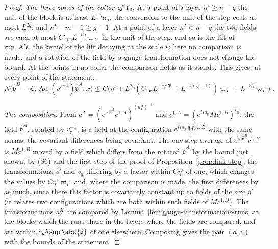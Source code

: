 \begin{proof}
\emph{The three zones of the collar of $Y_2$.} At a point of a layer $n' \geq n - q$ the unit of the block is at least $L^{-q}a_n$, the conversion to the unit of the step costs at most $L^{2q}$, and $n' - m - 1 \geq g - 1$. At a point of a layer $n' < n - q$ the two fields are each at most $C'_{\mathrm{dis}}L^{-5q}\varpi_\Gamma$ in the unit of the step, and so is the lift of run~A's, the kernel of the lift decaying at the scale $\varepsilon$; here no comparison is made, and a rotation of the field by a gauge transformation does not change the bound. At the points in no collar the comparison holds as it stands. This gives, at every point of the statement,
\[
    N\bigl(\hat{\mathfrak v}^B - \mathcal L_\iota\operatorname{Ad}(v'^{-1})\hat{\mathfrak v}^A; x\bigr) \leq C\bigl(\eta' + L^{2q}(C_{\mathrm{loc}}L^{-\nu/26} + L^{-4(g-1)})\varpi_\Gamma + L^{-5q}\varpi_\Gamma\bigr)\;.
\]

\emph{The composition.} From $c^A = (e^{i\varepsilon\hat{\mathfrak v}^A}c^{1,A})^{(u^A_\Gamma)^{-1}}$ and $c^{1,A} = (e^{i\varepsilon a_{\mathrm g}}Mc^{1,B})^{v_{\mathrm g}}$, the field $\hat{\mathfrak v}^A$, rotated by $v_{\mathrm g}^{-1}$, is a field at the configuration $e^{i\varepsilon a_{\mathrm g}}Mc^{1,B}$ with the same norms, the covariant differences being covariant. The one-step average of $e^{ih\hat{\mathfrak v}^B}c^{1,B}$ is $Mc^{1,B}$ moved by a field which differs from the rotated $\hat{\mathfrak v}^A$ by the bound just shown, by (S6) and the first step of the proof of Proposition~\ref{prop:link-step}, the transformations $v'$ and $v_{\mathrm g}$ differing by a factor within $C\eta'$ of one, which changes the values by $C\eta'\varpi_\Gamma$ and, where the comparison is made, the first differences by as much, since there this factor is covariantly constant up to fields of the size $\eta'$ (it relates two configurations which are both within such fields of $Mc^{1,B}$). The transformations $u^X_\Gamma$ are compared by Lemma~\ref{lem:gauge-transformations-runs} at the blocks which the runs share in the layers where the fields are compared, and are within $c_ub\sup\abs{\hat{\mathfrak v}}$ of one elsewhere. Composing gives the pair $(a, v)$ with the bounds of the statement.
\end{proof}



